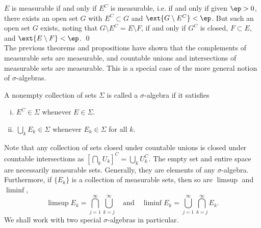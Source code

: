 \pf $E$ is measurable if and only if $E^C$ is measurable, i.e. if and only if given $\ep>0$, there exists an open set $G$ with $E^C \subset G$ and $\ext{G \setminus E^C}<\ep$. But such an open set $G$ exists, noting that $G \setminus E^C=E \setminus F$, if and only if $G^C$ is closed, $F \subset E$, and $\ext{E \setminus F}<\ep$. \qed \\












































The previous theorems and propositions have shown that the complements of measurable sets are measurable, and countable unions and intersections of measurable sets are measurable. This is a special case of the more general notion of $\sigma$-algebras. 

\begin{dfn}
A nonempty collection of sets $\Sigma$ is called a $\sigma$-algebra if it satisfies
	\begin{enumerate}[(i)]
	\item $E^C \in \Sigma$ whenever $E \in \Sigma$.
	\item $\bigcup_k E_k \in \Sigma$ whenever $E_k \in \Sigma$ for all $k$. 
	\end{enumerate}
\end{dfn}


Note that any collection of sets closed under countable unions is closed under countable intersections as $\left[\bigcap_k U_k \right]^C= \bigcup_k U_k^C$. The empty set and entire space are necessarily measurable sets. Generally, they are elements of any $\sigma$-algebra. Furthermore, if $\{E_k\}$ is a collection of measurable sets, then so are $\limsup$ and $\liminf$,
	\[
	\limsup E_k= \bigcap_{j=1}^\infty \bigcup_{k=j}^\infty \quad\text{and}\quad \liminf E_k= \bigcup_{j=1}^\infty \bigcap_{k=j}^\infty E_k.
	\]
We shall work with two special $\sigma$-algebras in particular.


